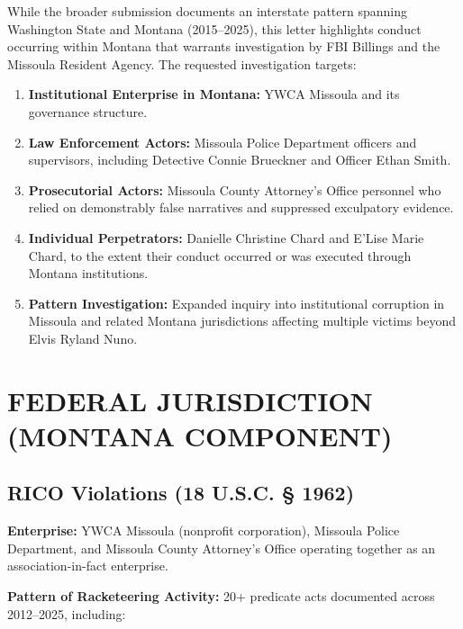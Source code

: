 \documentclass[12pt,oneside]{article}
\begin{document}
\begin{flushleft}
While the broader submission documents an interstate pattern spanning Washington State and Montana (2015--2025), this letter highlights conduct occurring within Montana that warrants investigation by FBI Billings and the Missoula Resident Agency. The requested investigation targets:

\begin{enumerate}
\item \textbf{Institutional Enterprise in Montana:} YWCA Missoula and its governance structure.
\item \textbf{Law Enforcement Actors:} Missoula Police Department officers and supervisors, including Detective Connie Brueckner and Officer Ethan Smith.
\item \textbf{Prosecutorial Actors:} Missoula County Attorney's Office personnel who relied on demonstrably false narratives and suppressed exculpatory evidence.
\item \textbf{Individual Perpetrators:} Danielle Christine Chard and E'Lise Marie Chard, to the extent their conduct occurred or was executed through Montana institutions.
\item \textbf{Pattern Investigation:} Expanded inquiry into institutional corruption in Missoula and related Montana jurisdictions affecting multiple victims beyond Elvis Ryland Nuno.
\end{enumerate}

\section*{FEDERAL JURISDICTION (MONTANA COMPONENT)}

\subsection*{RICO Violations (18 U.S.C. § 1962)}

\textbf{Enterprise:} YWCA Missoula (nonprofit corporation), Missoula Police Department, and Missoula County Attorney's Office operating together as an association-in-fact enterprise.

\textbf{Pattern of Racketeering Activity:} 20+ predicate acts documented across 2012--2025, including:


\end{flushleft}
\end{document}
